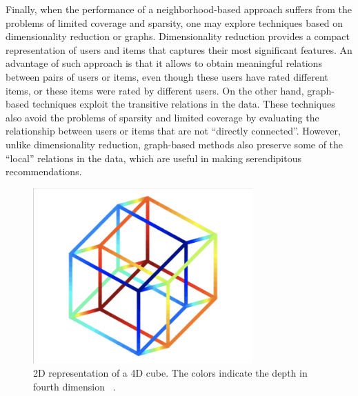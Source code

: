 Finally, when the performance of a neighborhood-based approach suffers from the problems of limited coverage and sparsity, one may explore techniques based on dimensionality reduction or graphs. Dimensionality reduction provides a compact representation of users and items that captures their most significant features. An advantage of such approach is that it allows to obtain meaningful relations between pairs of users or items, even though these users have rated different items, or these items were rated by different users. On the other hand, graph-based techniques exploit the transitive relations in the data. These techniques also avoid the problems of sparsity and limited coverage by evaluating the relationship between users or items that are not “directly connected”. However, unlike dimensionality reduction, graph-based methods also preserve some of the “local” relations in the data, which are useful in making serendipitous recommendations.

 \begin{figure}[!ht]
	\centering
	\includegraphics[width=0.75\textwidth]{figures/DimensionalityReduction.png}
	\caption{2D representation of a 4D cube. The colors indicate the depth in fourth dimension ~\parencite{lee2007nonlinear}.}
	\label{fig:embedding-projection-example}
\end{figure}


